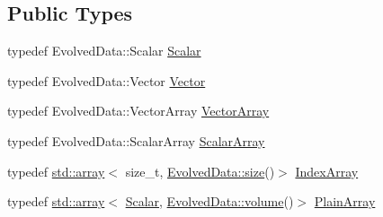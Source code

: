 \subsection*{Public Types}
\begin{DoxyCompactItemize}
\item 
typedef Evolved\+Data\+::\+Scalar \mbox{\hyperlink{class_a_rchain_3_01_newtonian_3_01typename_01_evolved_data_1_1_scalar_01_4_00_01_evolved_data_00_01_regularitor_01_4_a2c77dc1b58a25ac5c6ee95dd7809f693}{Scalar}}
\item 
typedef Evolved\+Data\+::\+Vector \mbox{\hyperlink{class_a_rchain_3_01_newtonian_3_01typename_01_evolved_data_1_1_scalar_01_4_00_01_evolved_data_00_01_regularitor_01_4_a0adb648f04fbe3ba3a0289376b56a9e1}{Vector}}
\item 
typedef Evolved\+Data\+::\+Vector\+Array \mbox{\hyperlink{class_a_rchain_3_01_newtonian_3_01typename_01_evolved_data_1_1_scalar_01_4_00_01_evolved_data_00_01_regularitor_01_4_a1ff7d2e64f488df9edae2ad796945bbd}{Vector\+Array}}
\item 
typedef Evolved\+Data\+::\+Scalar\+Array \mbox{\hyperlink{class_a_rchain_3_01_newtonian_3_01typename_01_evolved_data_1_1_scalar_01_4_00_01_evolved_data_00_01_regularitor_01_4_a65b11346d3c11858344b450f2247afd9}{Scalar\+Array}}
\item 
typedef \mbox{\hyperlink{class_a_rchain_aeb4d9b0a28ae3b4e4286edf838e5a905}{std\+::array}}$<$ size\+\_\+t, \mbox{\hyperlink{class_a_rchain_ac612af46ce057d56dc47a6d28738a4cf}{Evolved\+Data\+::size}}()$>$ \mbox{\hyperlink{class_a_rchain_3_01_newtonian_3_01typename_01_evolved_data_1_1_scalar_01_4_00_01_evolved_data_00_01_regularitor_01_4_a0072f8585c3e6ba8d64cb81be90fb376}{Index\+Array}}
\item 
typedef \mbox{\hyperlink{class_a_rchain_aeb4d9b0a28ae3b4e4286edf838e5a905}{std\+::array}}$<$ \mbox{\hyperlink{class_a_rchain_3_01_newtonian_3_01typename_01_evolved_data_1_1_scalar_01_4_00_01_evolved_data_00_01_regularitor_01_4_a2c77dc1b58a25ac5c6ee95dd7809f693}{Scalar}}, \mbox{\hyperlink{classparticle_system_aac9e6701e4486c89b508a2508b77089b}{Evolved\+Data\+::volume}}()$>$ \mbox{\hyperlink{class_a_rchain_3_01_newtonian_3_01typename_01_evolved_data_1_1_scalar_01_4_00_01_evolved_data_00_01_regularitor_01_4_a8cf940df8dabb6c78662f839c2b13c9a}{Plain\+Array}}
\end{DoxyCompactItemize}
